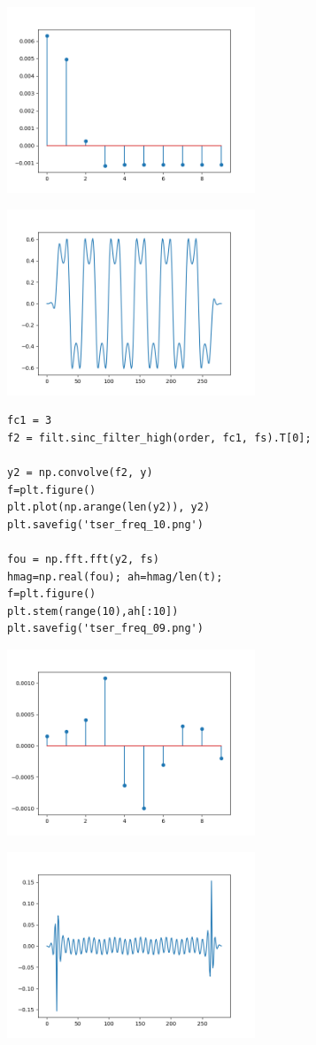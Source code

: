 \documentclass[12pt,fleqn]{article}\usepackage{../../common}
\begin{document}
\includegraphics[width=20em]{tser_freq_07.png}

\includegraphics[width=20em]{tser_freq_08.png}


\begin{verbatim}
fc1 = 3
f2 = filt.sinc_filter_high(order, fc1, fs).T[0];

y2 = np.convolve(f2, y)
f=plt.figure()
plt.plot(np.arange(len(y2)), y2)
plt.savefig('tser_freq_10.png')

fou = np.fft.fft(y2, fs)
hmag=np.real(fou); ah=hmag/len(t);
f=plt.figure()
plt.stem(range(10),ah[:10])
plt.savefig('tser_freq_09.png')
\end{verbatim}

\includegraphics[width=20em]{tser_freq_09.png}

\includegraphics[width=20em]{tser_freq_10.png}
\end{document}
